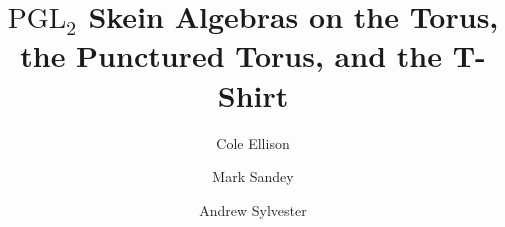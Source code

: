 \title{$\mathrm{PGL}_2$ Skein Algebras on the Torus, the Punctured Torus, and the T-Shirt}
\author[1]{Cole Ellison}
\author[2]{Mark Sandey}
\author[1]{Andrew Sylvester}
\date{}
